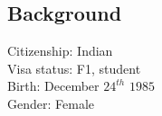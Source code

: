 \documentclass[margin,line,11pt]{res}
\begin{document}
\begin{resume}
\section{\sc Background}
Citizenship: Indian \\
Visa status: F1, student \\
Birth: December $24^{th}$ $1985$ \\
Gender: Female


\pagebreak
\end{resume}
\end{document}
